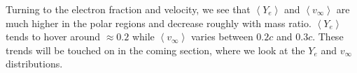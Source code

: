 Turning to the electron fraction and velocity, we see that $\left<Y_e\right>$ and
$\left<v_\infty\right>$ are much higher in the polar regions and decrease roughly with mass ratio. $\left<Y_e\right>$ tends to hover around $\approx 0.2$ while $\left<v_\infty\right>$ varies between $0.2c$ and $0.3c$. These trends will be touched on in the coming section, where we look at the $Y_e$ and $v_\infty$ distributions. 



